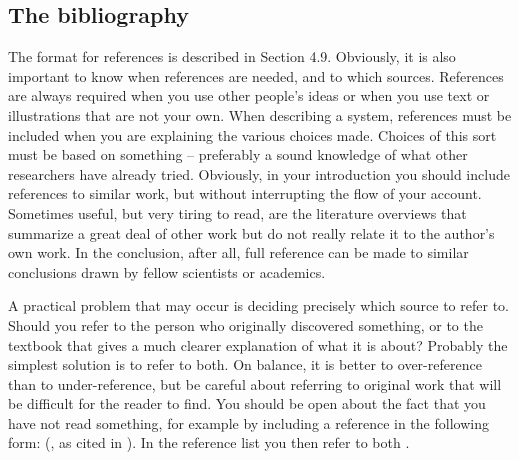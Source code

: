 \subsection{The bibliography}\label{sec:_the_bibliography}
The format for references is described in Section 4.9. Obviously, it is also important to know when references are needed, and to which sources. References are always required when you use other people’s ideas or when you use text or illustrations that are not your own. When describing a system, references must be included when you are explaining the various choices made. Choices of this sort must be based on something – preferably a sound knowledge of what other researchers have already tried. Obviously, in your introduction you should include references to similar work, but without interrupting the flow of your account. Sometimes useful, but very tiring to read, are the literature overviews that summarize a great deal of other work but do not really relate it to the author’s own work. In the conclusion, after all, full reference can be made to similar conclusions drawn by fellow scientists or academics.

A practical problem that may occur is deciding precisely which source to refer to. Should you refer to the person who originally discovered something, or to the textbook that gives a much clearer explanation of what it is about? Probably the simplest solution is to refer to both. On balance, it is better to over-reference than to under-reference, but be careful about referring to original work that will be difficult for the reader to find. You should be open about the fact that you have not read something, for example by including a reference in the following form: (\citealp{schwartz97}, as cited in \citealp{berrah99}). In the reference list you then refer to both \citetext{\citeauthor{schwartz97}, without the cited bit, and \citeauthor{berrah99}}.